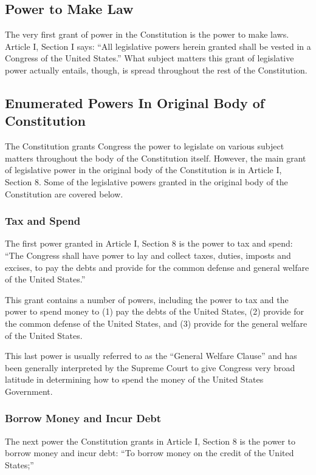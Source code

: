 \subsection{Power to Make Law}
The very first grant of power in the Constitution is the power to make laws.  Article I, Section I says: ``All legislative powers herein granted shall be vested in a Congress of the United States.''  What subject matters this grant of legislative power actually entails, though, is spread throughout the rest of the Constitution.

\subsection{Enumerated Powers In Original Body of Constitution}
The Constitution grants Congress the power to legislate on various subject matters throughout the body of the Constitution itself.  However, the main grant of legislative power in the original body of the Constitution is in Article I, Section 8.  Some of the legislative powers granted in the original body of the Constitution are covered below.

\subsubsection{Tax and Spend}
The first power granted in Article I, Section 8 is the power to tax and spend: ``The Congress shall have power to lay and collect taxes, duties, imposts and excises, to pay the debts and provide for the common defense and general welfare of the United States.''

This grant contains a number of powers, including the power to tax and the power to spend money to (1) pay the debts of the United States, (2) provide for the common defense of the United States, and (3) provide for the general welfare of the United States.

This last power is usually referred to as the ``General Welfare Clause'' and has been generally interpreted by the Supreme Court to give Congress very broad latitude in determining how to spend the money of the United States Government.

\subsubsection{Borrow Money and Incur Debt}
The next power the Constitution grants in Article I, Section 8 is the power to borrow money and incur debt: ``To borrow money on the credit of the United States;''

